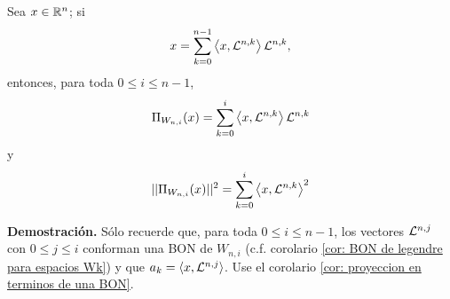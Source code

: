 \begin{prop}
\label{prop: proyecciones a espacios Wn,k}
Sea $x \in \mathbb{R}^{n}$; si
\[
x= \sum\limits_{k=0}^{n-1}\left\langle x, \mathcal{L}^{n,k} \right\rangle\mathcal{L}^{n,k},
\]
entonces, para toda $0 \leq i \leq n-1$,
\[
\Pi_{W_{n,i}}(x)=\sum\limits_{k=0}^{i}\left\langle x, \mathcal{L}^{n,k} \right\rangle\mathcal{L}^{n,k}
\]
y
\[
||\Pi_{W_{n,i}}(x)||^{2}=\sum\limits_{k=0}^{i}\left\langle x, \mathcal{L}^{n,k} \right\rangle^{2}
\]
\end{prop}
\textbf{Demostración.}
Sólo recuerde que, para toda $0 \leq i \leq n-1$,
los vectores $\mathcal{L}^{n, j}$ con $0 \leq j \leq i$
conforman una BON de $W_{n,i}$
(c.f. corolario \ref{cor: BON de legendre para espacios Wk}) y
que $a_{k}= \langle x, \mathcal{L}^{n,j} \rangle$.
Use el corolario \ref{cor: proyeccion en terminos de una BON}.
\QEDB 
\vspace{0.2cm}

